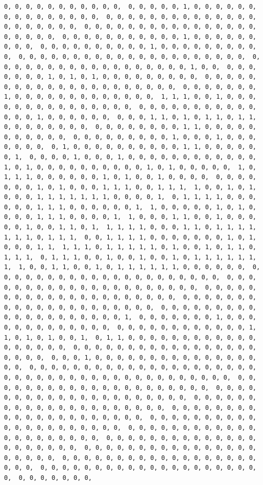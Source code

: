 \documentclass[
]{article}
\begin{document}
\begin{verbatim}
0, 0, 0, 0, 0, 0, 0, 0, 0, 0, 0,  0, 0, 0, 0, 0, 1, 0, 0, 0, 0, 0, 0, 0, 0, 0, 0, 0, 0, 0, 0, 0,  0, 0, 0, 0, 0, 0, 0, 0, 0, 0, 0, 0, 0, 0, 0, 0, 0, 0, 0, 0, 0,  0, 0, 0, 0, 0, 0, 0, 0, 0, 0, 0, 0, 0, 0, 0, 0, 0, 0, 0, 0, 0,  0, 0, 0, 0, 0, 0, 0, 0, 0, 0, 0, 1, 0, 0, 0, 0, 0, 0, 0, 0, 0,  0, 0, 0, 0, 0, 0, 0, 0, 0, 0, 1, 0, 0, 0, 0, 0, 0, 0, 0, 0, 0,  0, 0, 0, 0, 0, 0, 0, 0, 0, 0, 0, 0, 0, 0, 0, 0, 0, 0, 0, 0, 0,  0, 0, 0, 0, 0, 0, 0, 0, 0, 0, 0, 0, 0, 0, 0, 0, 0, 0, 1, 0, 0,  0, 0, 0, 0, 0, 0, 0, 1, 0, 1, 0, 1, 0, 0, 0, 0, 0, 0, 0, 0, 0,  0, 0, 0, 0, 0, 0, 0, 0, 0, 0, 0, 0, 0, 0, 0, 0, 0, 0, 0, 0, 0,  0, 0, 0, 0, 0, 0, 0, 1, 0, 0, 0, 0, 0, 0, 0, 0, 0, 0, 0, 0, 0,  1, 1, 1, 0, 0, 1, 0, 0, 0, 0, 0, 0, 0, 0, 0, 0, 0, 0, 0, 0, 0,  0, 0, 0, 0, 0, 0, 0, 0, 0, 0, 0, 0, 0, 0, 1, 0, 0, 0, 0, 0, 0,  0, 0, 0, 1, 1, 0, 1, 0, 1, 1, 0, 1, 1, 0, 0, 0, 0, 0, 0, 0, 0,  0, 0, 0, 0, 0, 0, 0, 0, 1, 1, 0, 0, 0, 0, 0, 0, 0, 0, 0, 0, 0,  0, 0, 0, 0, 0, 0, 0, 0, 0, 1, 0, 0, 0, 1, 0, 0, 0, 0, 0, 0, 0,  0, 1, 0, 0, 0, 0, 0, 0, 0, 0, 0, 0, 1, 1, 0, 0, 0, 0, 0, 0, 1,  0, 0, 0, 0, 1, 0, 0, 0, 1, 0, 0, 0, 0, 0, 0, 0, 0, 0, 0, 0, 0,  1, 0, 1, 0, 0, 0, 0, 0, 0, 0, 0, 0, 0, 1, 0, 1, 0, 0, 0, 0, 0,  1, 0, 1, 1, 1, 0, 0, 0, 0, 0, 0, 1, 0, 1, 0, 0, 1, 0, 0, 0, 0,  0, 0, 0, 0, 0, 0, 0, 1, 0, 1, 0, 0, 0, 1, 1, 1, 0, 0, 1, 1, 1,  1, 0, 0, 1, 0, 1, 0, 0, 0, 1, 1, 1, 1, 1, 1, 1, 0, 0, 0, 0, 1,  0, 1, 1, 1, 1, 0, 0, 0, 0, 0, 0, 1, 1, 1, 0, 0, 0, 0, 0, 0, 1,  1, 0, 0, 0, 0, 0, 1, 0, 1, 0, 0, 0, 0, 1, 1, 1, 0, 0, 0, 0, 1,  1, 0, 0, 0, 1, 1, 0, 0, 1, 0, 0, 0, 0, 0, 1, 0, 0, 1, 1, 0, 1,  1, 1, 1, 1, 0, 0, 0, 1, 1, 0, 1, 1, 1, 1, 1, 1, 1, 0, 1, 1, 1,  0, 0, 1, 1, 1, 1, 0, 0, 0, 0, 0, 0, 0, 1, 0, 1, 0, 0, 0, 1, 1,  1, 1, 1, 0, 1, 1, 1, 1, 1, 0, 1, 0, 0, 1, 0, 1, 1, 0, 1, 1, 1,  0, 1, 1, 1, 0, 0, 1, 0, 0, 1, 0, 0, 1, 0, 1, 1, 1, 1, 1, 1, 1,  1, 0, 0, 1, 1, 0, 0, 1, 0, 1, 1, 1, 1, 1, 1, 0, 0, 0, 0, 0, 0,  0, 0, 0, 0, 0, 0, 0, 0, 0, 0, 0, 0, 0, 0, 0, 0, 0, 0, 0, 0, 0,  0, 0, 0, 0, 0, 0, 0, 0, 0, 0, 0, 0, 0, 0, 0, 0, 0, 0, 0, 0, 0,  0, 0, 0, 0, 0, 0, 0, 0, 0, 0, 0, 0, 0, 0, 0, 0, 0, 0, 0, 0, 0,  0, 0, 0, 0, 0, 0, 0, 0, 0, 0, 0, 0, 0, 0, 0, 0, 0, 0, 0, 0, 0,  0, 0, 0, 0, 0, 0, 0, 0, 0, 0, 0, 0, 0, 0, 0, 0, 0, 0, 0, 0, 1,  0, 0, 0, 0, 0, 0, 0, 1, 0, 0, 0, 0, 0, 0, 0, 0, 0, 0, 0, 0, 0,  0, 0, 0, 0, 0, 0, 0, 0, 0, 0, 0, 0, 1, 1, 0, 1, 0, 1, 0, 0, 1,  0, 1, 1, 0, 0, 0, 0, 0, 0, 0, 0, 0, 0, 0, 0, 0, 0, 0, 0, 0, 0,  0, 0, 0, 0, 0, 0, 0, 0, 0, 0, 0, 0, 0, 0, 0, 0, 0, 0, 0, 0, 0,  0, 0, 0, 1, 0, 0, 0, 0, 0, 0, 0, 0, 0, 0, 0, 0, 0, 0, 0, 0, 0,  0, 0, 0, 0, 0, 0, 0, 0, 0, 0, 0, 0, 0, 0, 0, 0, 0, 0, 0, 0, 0,  0, 0, 0, 0, 0, 0, 0, 0, 0, 0, 0, 0, 0, 0, 0, 0, 0, 0, 0, 0, 0,  0, 0, 0, 0, 0, 0, 0, 0, 0, 0, 0, 0, 0, 0, 0, 0, 0, 0, 0, 0, 0,  0, 0, 0, 0, 0, 0, 0, 0, 0, 0, 0, 0, 0, 0, 0, 0, 0, 0, 0, 0, 0,  0, 0, 0, 0, 0, 0, 0, 0, 0, 0, 0, 0, 0, 0, 0, 0, 0, 0, 0, 0, 0,  0, 0, 0, 0, 0, 0, 0, 0, 0, 0, 0, 0, 0, 0, 0, 0, 0, 0, 0, 0, 0,  0, 0, 0, 0, 0, 0, 0, 0, 0, 0, 0, 0, 0, 0, 0, 0, 0, 0, 0, 0, 0,  0, 0, 0, 0, 0, 0, 0, 0, 0, 0, 0, 0, 0, 0, 0, 0, 0, 0, 0, 0, 0,  0, 0, 0, 0, 0, 0, 0, 0, 0, 0, 0, 0, 0, 0, 0, 0, 0, 0, 0, 0, 0,  0, 0, 0, 0, 0, 0, 0, 0, 0, 0, 0, 0, 0, 0, 0, 0, 0, 0, 0, 0, 0,  0, 0, 0, 0, 0, 0, 0, 0, 0, 0, 0, 0, 0, 0, 0, 0, 0, 0, 0, 0, 0,  0, 0, 0, 0, 0, 0, 0, 0, 0, 0, 0, 0, 0, 0, 0, 0, 0, 0, 0, 0, 0,  0, 0, 0, 0, 0, 0, 0, 
\end{verbatim}
\end{document}
